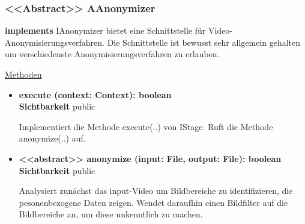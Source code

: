 \subsubsection{<<Abstract>> AAnonymizer} \label{service:klasse:AAnonymizer}
\textbf{implements}  \newline
IAnonymizer bietet eine Schnittstelle für Video-Anonymisierungsverfahren. Die Schnittstelle ist bewusst sehr allgemein gehalten um verschiedenste Anonymisierungsverfahren zu erlauben. \newline

\underline{Methoden}
\begin{itemize}
\itemsep0pt
\item \textbf{execute (context: Context): boolean}\hfill\\
\textbf{Sichtbarkeit} public

Implementiert die Methode execute(..) von IStage. Ruft die Methode anonymize(..) auf.

\item \textbf{<<abstract>> anonymize (input: File, output: File): boolean}\hfill\\
\textbf{Sichtbarkeit} public

Analysiert zunächst das input-Video um Bildbereiche zu identifizieren, die pesonenbezogene Daten zeigen. Wendet daraufhin einen Bildfilter auf die Bildbereiche an, um diese unkenntlich zu machen.

\end{itemize}